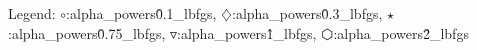 Legend: {\color{NavyBlue}$\circ$}:alpha\_powers\^0.1\_lbfgs, {\color{Magenta}$\diamondsuit$}:alpha\_powers\^0.3\_lbfgs, {\color{Orange}$\star$}:alpha\_powers\^0.75\_lbfgs, {\color{CornflowerBlue}$\triangledown$}:alpha\_powers\^1\_lbfgs, {\color{red}$\varhexagon$}:alpha\_powers\^2\_lbfgs